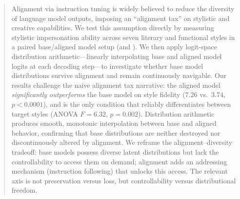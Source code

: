 \begin{abstract}
Alignment via instruction tuning is widely believed to reduce the diversity
of language model outputs, imposing an ``alignment tax'' on stylistic and
creative capabilities. We test this assumption directly by measuring
stylistic impersonation ability across seven literary and functional styles
in a paired base/aligned model setup (\qwenbase and \qweninst). We then
apply logit-space distribution arithmetic---linearly interpolating base and
aligned model logits at each decoding step---to investigate whether base
model distributions survive alignment and remain continuously navigable.
Our results challenge the naive alignment tax narrative: the aligned model
\emph{significantly outperforms} the base model on style fidelity
($7.26$ vs.\ $3.74$, $p < 0.0001$), and is the only condition that
reliably differentiates between target styles (ANOVA $F\!=\!6.32$,
$p\!=\!0.002$). Distribution arithmetic produces smooth, monotonic
interpolation between base and aligned behavior, confirming that base
distributions are neither destroyed nor discontinuously altered by
alignment. We reframe the alignment--diversity tradeoff: base models
possess diverse latent distributions but lack the controllability to
access them on demand; alignment adds an addressing mechanism
(instruction following) that unlocks this access. The relevant axis is
not preservation versus loss, but controllability versus distributional
freedom.
\end{abstract}
